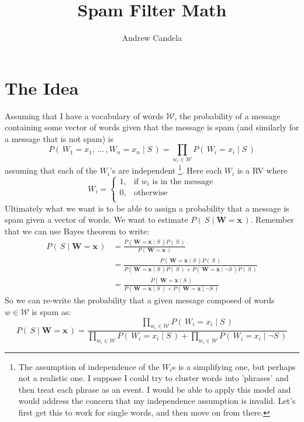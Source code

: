 \documentclass[11pt, oneside]{article}   	%
\title{Spam Filter Math}
\author{Andrew Candela}
\newcommand{\ffrac}[2]{\ensuremath{\frac{\displaystyle #1}{\displaystyle #2}}}
\begin{document}
\maketitle
\newpage
\section*{The Idea}Assuming that I have a vocabulary of words \(\mathcal{W}\), the probability of a message containing some vector of words given that the message is spam (and similarly for a message that is not spam) is \[P(\,W_1 = x_1,\, \ldots \,, W_n = x_n \mid S \,) = \prod_{w_i \in \mathcal{W}}P(\,W_i=x_i\mid S\,)\] assuming that each of the \(W_i\)'s are independent \footnote{The assumption of independence of the \(W_i \)s is a simplifying one, but perhaps not a realistic one. I suppose I could try to cluster words into 'phrases' and then treat each phrase as an event. I would be able to apply this model and would address the concern that my independence assumption is invalid. Let's first get this to work for single words, and then move on from there.}. Here each \(W_i\) is a RV where 
\[
W_i= \begin{cases}
1, & \text{if } w_i \text{ is in the message} \\
0,  & \text{otherwise} \\
\end{cases}
\]
Ultimately what we want is to be able to assign a probability that a message is spam given a vector of words. We want to estimate $P(\,S \mid \bm{W} = \bm{x}\,)$. Remember that we can use Bayes theorem to write:
\begin{align*}
P(\,S\mid \bm{W}=\bm{x}\,) &= \frac 
	{P(\,\bm{W}=\bm{x} \mid S\,)P(\,S\,)} 
	{P(\,\bm{W}=\bm{x}\,)} \\
	&= \frac
	{P(\,\bm{W}=\bm{x} \mid S\,)P(\,S\,)} 
	{P(\,\bm{W}=\bm{x} \mid S\,)P(\,S\,) + P(\,\bm{W}=\bm{x} \mid \neg S\,)P(\,S\,)}  \\
	&= \frac
	{P(\,\bm{W}=\bm{x} \mid S\,)} 
	{P(\,\bm{W}=\bm{x} \mid S\,) + P(\,\bm{W}=\bm{x} \mid \neg S\,)}
\end{align*}
So we can re-write the probability that a given message composed of words $w \in \mathcal{W}$ is spam as:
\begin{equation}
P(\,S\mid \bm{W}=\bm{x}\,) = \ffrac
	{ \prod_{w_i \in \mathcal{W}} P(\,W_i=x_i \mid S\,)}
	{ \prod_{w_i \in \mathcal{W}} P(\,W_i=x_i \mid S\,) + \prod_{w_i \in \mathcal{W}} P(\,W_i=x_i \mid \neg S\,)}
\end{equation}
\end{document}
